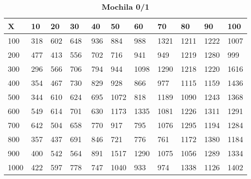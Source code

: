 \documentclass[10pt,letterpaper]{article}
\begin{document}
\newpage 
{}
\begin{center}
\begin{table}\renewcommand{\arraystretch}{2.5}
\caption{\large \textbf{Mochila 0/1}}
\centering
\begin{tabular} { |m{0.5cm}|m{1.3cm}|m{1.3cm}|m{1.3cm}|m{1.3cm}|m{1.3cm}|m{1.3cm}|m{1.3cm}|m{1.3cm}|m{1.3cm}|m{1.3cm}|} 
\hline
\rowcolor{Gray}
\centering \textbf{X} & \centering \textbf{10} & \centering \textbf{20} & \centering \textbf{30}\ & \centering \textbf{40} & \centering \textbf{50} & \centering \textbf{60}\ & \centering \textbf{70} & \centering \textbf{80} & \centering \textbf{90}\ & \textbf{100} \\\hline
\cellcolor{Gray}100 & \Large 318 & \Large 602 & \Large 648 & \Large 936 & \Large 884 & \Large 988 & \Large 1321 & \Large 1211 & \Large 1222 & \Large 1007 \\
\hline
\cellcolor{Gray}200 & \Large 477 & \Large 413 & \Large 556 & \Large 702 & \Large 716 & \Large 941 & \Large 949 & \Large 1219 & \Large 1280 & \Large 999 \\
\hline
\cellcolor{Gray}300 & \Large 296 & \Large 566 & \Large 706 & \Large 794 & \Large 944 & \Large 1098 & \Large 1290 & \Large 1218 & \Large 1220 & \Large 1616 \\
\hline
\cellcolor{Gray}400 & \Large 354 & \Large 467 & \Large 730 & \Large 829 & \Large 928 & \Large 866 & \Large 977 & \Large 1115 & \Large 1159 & \Large 1436 \\
\hline
\cellcolor{Gray}500 & \Large 344 & \Large 610 & \Large 624 & \Large 695 & \Large 1072 & \Large 818 & \Large 1189 & \Large 1090 & \Large 1243 & \Large 1368 \\
\hline
\cellcolor{Gray}600 & \Large 549 & \Large 614 & \Large 701 & \Large 630 & \Large 1173 & \Large 1335 & \Large 1081 & \Large 1226 & \Large 1311 & \Large 1291 \\
\hline
\cellcolor{Gray}700 & \Large 642 & \Large 504 & \Large 658 & \Large 770 & \Large 917 & \Large 795 & \Large 1076 & \Large 1295 & \Large 1194 & \Large 1284 \\
\hline
\cellcolor{Gray}800 & \Large 357 & \Large 437 & \Large 691 & \Large 846 & \Large 721 & \Large 776 & \Large 761 & \Large 1172 & \Large 1380 & \Large 1184 \\
\hline
\cellcolor{Gray}900 & \Large 400 & \Large 542 & \Large 564 & \Large 891 & \Large 1517 & \Large 1290 & \Large 1075 & \Large 1056 & \Large 1289 & \Large 1334 \\
\hline
\cellcolor{Gray}1000 & \Large 422 & \Large 597 & \Large 778 & \Large 747 & \Large 1040 & \Large 933 & \Large 974 & \Large 1338 & \Large 1126 & \Large 1402 \\
\hline
\end{tabular} \\
\end{table}
\end{center}
\end{document}
